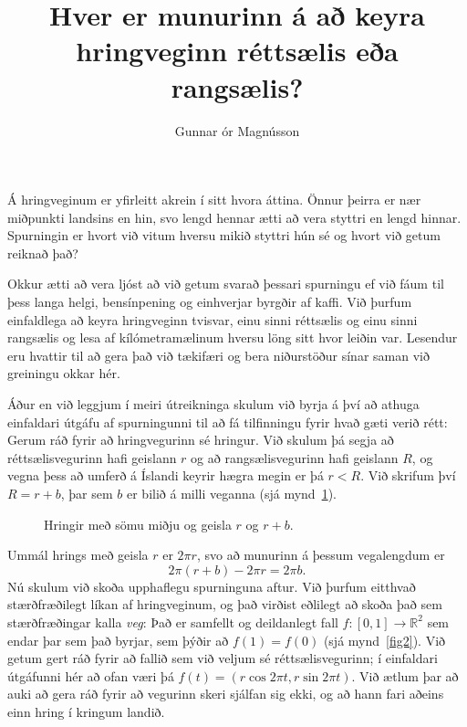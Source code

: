 \documentclass[10pt,a4paper]{amsart}
\author{Gunnar \TH\'or Magn\'usson}
\title[Lengdin \'a hringveginum]{Hver er munurinn á að keyra\\
hringveginn réttsælis eða rangsælis?}
\begin{document}
\maketitle

Á hringveginum er yfirleitt akrein í sitt hvora áttina. Önnur þeirra er nær
miðpunkti landsins en hin, svo lengd hennar ætti að vera styttri en lengd
hinnar. Spurningin er hvort við vitum hversu mikið styttri hún sé og hvort við
getum reiknað það?

Okkur ætti að vera ljóst að við getum svarað þessari spurningu ef við fáum til
þess langa helgi, bensínpening og einhverjar byrgðir af kaffi. Við þurfum
einfaldlega að keyra hringveginn tvisvar, einu sinni réttsælis og einu sinni
rangsælis og lesa af kílómetramælinum hversu löng sitt hvor leiðin var.
Lesendur eru hvattir til að gera það við tækifæri og bera niðurstöður sínar
saman við greiningu okkar hér.

Áður en við leggjum í meiri útreikninga skulum við byrja á því að athuga
einfaldari útgáfu af spurningunni til að fá tilfinningu fyrir hvað gæti verið
rétt: Gerum ráð fyrir að hringvegurinn sé hringur. Við skulum þá segja að
réttsælisvegurinn hafi geislann $r$ og að
rangsælisvegurinn hafi geislann $R$, og vegna þess að umferð á Íslandi keyrir
hægra megin er þá $r < R$. Við skrifum því $R = r + b$, þar sem $b$ er bilið á
milli veganna (sjá mynd~\ref{fig1}).
\begin{figure}[h!]
	\caption{Hringir með sömu miðju og geisla $r$ og $r+b$.}
	\label{fig1}
\end{figure}
Ummál hrings með geisla $r$ er $2\pi r$, svo að munurinn á
þessum vegalengdum er
$$
2\pi (r + b) - 2 \pi r = 2 \pi b.
$$
Nú skulum við skoða upphaflegu spurninguna aftur. Við þurfum eitthvað
stærðfræðilegt líkan af hringveginum, og það virðist eðlilegt að skoða það sem
stærðfræðingar kalla \emph{veg}: Það er samfellt og deildanlegt fall $f : [0,1] \to
\mathbb{R}^2$ sem endar þar sem það byrjar, sem þýðir að $f(1) = f(0)$ (sjá mynd~\ref{fig2}). Við
getum gert ráð fyrir að fallið sem við veljum sé réttsælisvegurinn; í
einfaldari útgáfunni hér að ofan væri þá $f(t) = (r \cos 2\pi t, r \sin 2\pi
t)$. Við ætlum þar að auki að gera ráð fyrir að vegurinn skeri sjálfan sig
ekki, og að hann fari aðeins einn hring í kringum landið.
\end{document}
